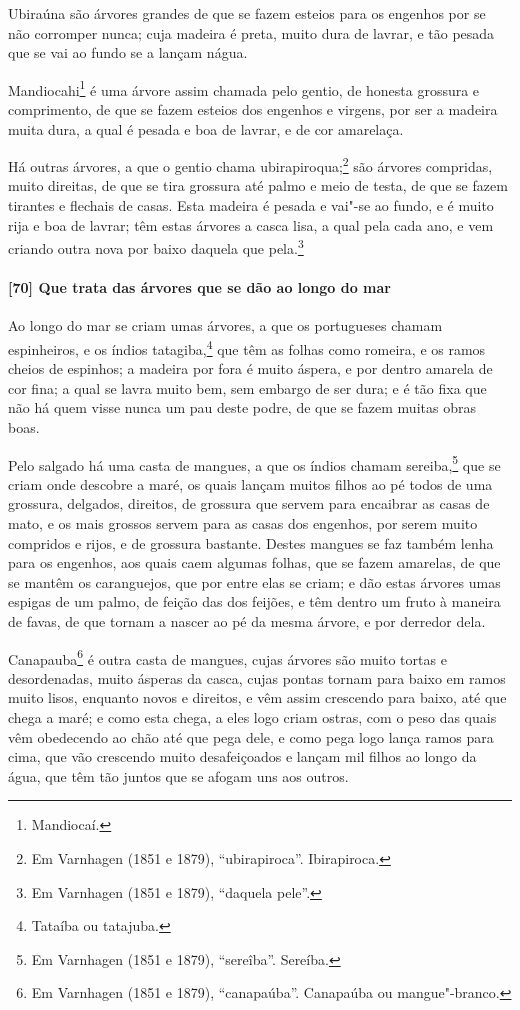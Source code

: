 \begin{linenumbers}
Ubiraúna são árvores grandes de que se fazem esteios para os engenhos por se não corromper
nunca; cuja madeira é preta, muito dura de lavrar, e tão pesada que se vai ao fundo se a
lançam nágua.

Mandiocahi\footnote{ Mandiocaí.} é uma árvore assim chamada pelo gentio, de honesta
grossura e comprimento, de que se fazem esteios dos engenhos e virgens, por ser a madeira
muita dura, a qual é pesada e boa de lavrar, e de cor amarelaça.


Há outras árvores, a que o gentio chama ubirapiroqua;\footnote{ Em Varnhagen (1851 e
1879), ``ubirapiroca''. Ibirapiroca.} são árvores compridas, muito direitas, de que se
tira grossura até palmo e meio de testa, de que se fazem tirantes e flechais de casas.
Esta madeira é pesada e vai"-se ao fundo, e é muito rija e boa de lavrar; têm estas árvores
a casca lisa, a qual pela cada ano, e vem criando outra nova por baixo daquela que
pela.\footnote{ Em Varnhagen (1851 e 1879), ``daquela pele''.}

\paragraph{[70] Que trata das árvores que se dão ao longo do mar}\quad
Ao longo do mar se criam umas árvores, a que os portugueses chamam espinheiros, e os
índios tatagiba,\footnote{ Tataíba ou tatajuba.} que têm as folhas como romeira, e os
ramos cheios de espinhos; a madeira por fora é muito áspera, e por dentro amarela de cor
fina; a qual se lavra muito bem, sem embargo de ser dura; e é tão fixa que não há quem
visse nunca um pau deste podre, de que se fazem muitas obras boas.

Pelo salgado há uma casta de mangues, a que os índios chamam sereiba,\footnote{ Em
Varnhagen (1851 e 1879), ``sereîba''. Sereíba.} que se criam onde descobre a maré, os
quais lançam muitos filhos ao pé todos de uma grossura, delgados, direitos, de grossura
que servem para encaibrar as casas de mato, e os mais grossos servem para as casas dos
engenhos, por serem muito compridos e rijos, e de grossura bastante. Destes mangues se faz
também lenha para os engenhos, aos quais caem algumas folhas, que se fazem amarelas, de
que se mantêm os caranguejos, que por entre elas se criam; e dão estas árvores umas
espigas de um palmo, de feição das dos feijões, e têm dentro um fruto à maneira de favas,
de que tornam a nascer ao pé da mesma árvore, e por derredor dela.

Canapauba\footnote{ Em Varnhagen (1851 e 1879), ``canapaúba''. Canapaúba ou
mangue"-branco.} é outra casta de mangues, cujas árvores são muito tortas e desordenadas,
muito ásperas da casca, cujas pontas tornam para baixo em ramos muito lisos, enquanto
novos e direitos, e vêm assim crescendo para baixo, até que chega a maré; e como esta
chega, a eles logo criam ostras, com o peso das quais vêm obedecendo ao chão até que pega
dele, e como pega logo lança ramos para cima, que vão crescendo muito desafeiçoados e
lançam mil filhos ao longo da água, que têm tão juntos que se afogam uns aos outros.


\end{linenumbers}
